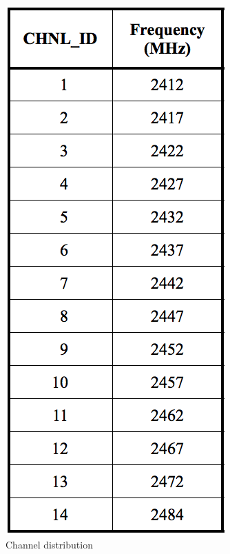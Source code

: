 	\begin{figure}
		\caption{\newline Channel distribution}
		\label{fig:channels}
		\includegraphics[width=1\linewidth]{Images/Channels80211.png}
	\end{figure}


